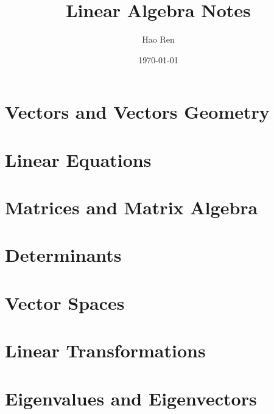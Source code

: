 \documentclass{article}
\begin{document}
\title{Linear Algebra Notes}
\author{Hao Ren}
\date{\today}
\maketitle

\newpage

\tableofcontents

\newpage

\section{Vectors and Vectors Geometry}

\section{Linear Equations}

\section{Matrices and Matrix Algebra}

\section{Determinants}

\section{Vector Spaces}

\section{Linear Transformations}

\section{Eigenvalues and Eigenvectors}
\end{document}
